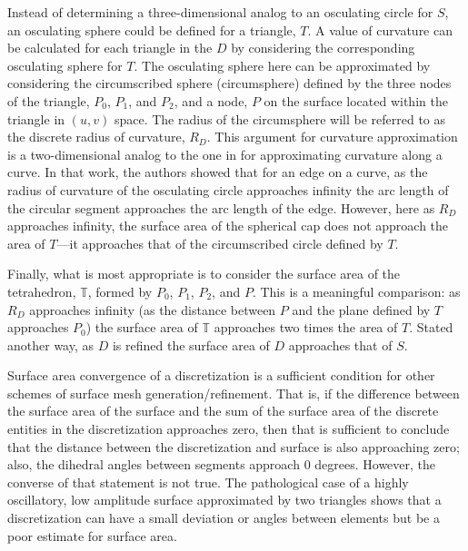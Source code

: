 Instead of determining a three-dimensional analog to an osculating
circle for $S$, an osculating sphere could be defined for a triangle,
$T$. A value of curvature can be calculated for each triangle in the $D$
by considering the corresponding osculating sphere for $T$. The
osculating sphere here can be approximated by considering the
circumscribed sphere (circumsphere) \cite{casey1888} defined by the
three nodes of the triangle, $P_0$, $P_1$, and $P_2$, and a node, $P$
on the surface located within the triangle in $(u,v)$ space. The radius
of the circumsphere will be referred to as the discrete radius of
curvature, $R_D$. This argument for curvature approximation is a
two-dimensional analog to the one in \cite{mclaurin12} for approximating
curvature along a curve. In that work, the authors showed that for an
edge on a curve, as the radius of curvature of the osculating circle
approaches infinity the arc length of the circular segment approaches
the arc length of the edge.  However, here as $R_D$ approaches infinity,
the surface area of the spherical cap does not approach the area of
$T$---it approaches that of the circumscribed circle defined by $T$.

Finally, what is most appropriate is to consider the surface area of the
tetrahedron, ${\mathbb T}$, formed by $P_0$, $P_1$, $P_2$, and $P$. This
is a meaningful comparison: as $R_D$ approaches infinity (as the
distance between $P$ and the plane defined by $T$ approaches $P_0$) the
surface area of ${\mathbb T}$ approaches two times the area of $T$.
Stated another way, as $D$ is refined the surface area of $D$ approaches
that of $S$.

Surface area convergence of a discretization is a sufficient condition
for other schemes of surface mesh generation/refinement. That is, if the
difference between the surface area of the surface and the sum of the
surface area of the discrete entities in the discretization approaches
zero, then that is sufficient to conclude that the distance between the
discretization and surface is also approaching zero; also, the dihedral
angles between segments approach $0$ degrees. However, the converse of
that statement is not true. The pathological case of a highly
oscillatory, low amplitude surface approximated by two triangles shows
that a discretization can have a small deviation or angles between
elements but be a poor estimate for surface area.
